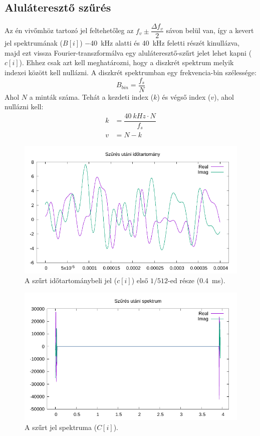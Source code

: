 	\subsection{Aluláteresztő szűrés}
		Az én vivőmhöz tartozó jel feltehetőleg az $f_v\pm \dfrac{\Delta f_v}{2}$ sávon belül van, így a kevert jel spektrumának ($B[i]$) \qty{-40}{kHz} alatti és \qty{40}{kHz} feletti részét kinullázva, majd ezt vissza Fourier-transzformálva egy aluláteresztő-szűrt jelet lehet kapni ($c[i]$). Ehhez csak azt kell meghatározni, hogy a diszkrét spektrum melyik indexei között kell nullázni. A diszkrét spektrumban egy frekvencia-bin szélessége:
		\begin{equation}
			B_{bin} = \dfrac{f_s}{N}
		\end{equation}
		Ahol $N$ a minták száma. Tehát a kezdeti index ($k$) és végső index ($v$), ahol nullázni kell:
		\begin{align}
			k & = \dfrac{\qty{40}{kHz}\cdot N}{f_s} \\
			v & = N-k
		\end{align}
		\begin{figure}[h!]
			\centering
			\includegraphics[width=\textwidth]{kep/filtered_samples.pdf}
			\caption{A szűrt időtartománybeli jel ($c[i]$) első $1/512$-ed része (\qty{0.4}{ms}).}
		\end{figure}	
		\begin{figure}[h!]
			\centering
			\includegraphics[width=\textwidth]{kep/filtered_spectrum.pdf}
			\caption{A szűrt jel spektruma ($C[i]$).}
		\end{figure}
